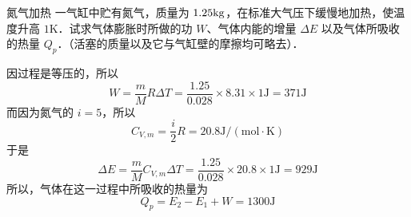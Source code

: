 \begin{example}{氮气加热}
一气缸中贮有氮气，质量为 $1.25\rm kg$，在标准大气压下缓慢地加热，使温度升高 $1\mathrm K$．试求气体膨胀时所做的功 $W$、气体内能的增量 $\Delta E$ 以及气体所吸收的热量 $Q_p$．（活塞的质量以及它与气缸壁的摩擦均可略去）．

因过程是等压的，所以
\begin{equation}
W=\frac{m}{M} R \Delta T=\frac{1.25}{0.028} \times 8.31 \times 1 \mathrm{J}=371 \mathrm{J}
\end{equation}
而因为氮气的 $i=5$，所以
\begin{equation}
C_{V, {m}}=\frac{i}{2} R=20.8 \mathrm{J} /(\mathrm{mol} \cdot \mathrm{K})
\end{equation}
于是
\begin{equation}
\Delta E=\frac{m}{M} C_{V, {m}} \Delta T=\frac{1.25}{0.028} \times 20.8 \times 1 \mathrm{J}=929 \mathrm{J}
\end{equation}
所以，气体在这一过程中所吸收的热量为
\begin{equation}
Q_{p}=E_{2}-E_{1}+W=1300 \mathrm{J}
\end{equation}
\end{example}   